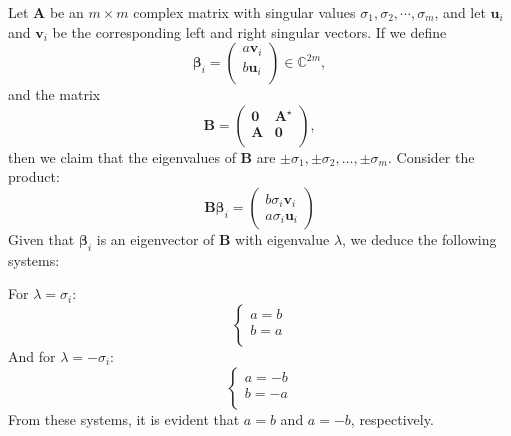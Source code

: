 \documentclass{article}
\begin{document}
Let $\bm{A}$ be an $m \times m$ complex matrix with singular values $\sigma_1, \sigma_2, \cdots, \sigma_m$, and let $\bm{u}_i$ and $\bm{v}_i$ be the corresponding left and right singular vectors. If we define 
\[ \bm{\beta}_i = \begin{pmatrix}
a \bm{v}_i \\
b \bm{u}_i \\
\end{pmatrix} \in \mathbb{C}^{2m}, \]
and the matrix
\[ \bm{B} = \begin{pmatrix}
\bm{0} & \bm{A}^\star \\
\bm{A} & \bm{0} \\
\end{pmatrix}, \]
then we claim that the eigenvalues of $ \bm{B} $ are $ \pm \sigma_1, \pm \sigma_2, \dots, \pm \sigma_m $.
Consider the product:
$$
\bm{B} \bm{\beta}_i =  \begin{pmatrix}
b \sigma_i \bm{v}_i\\
a \sigma_i \bm{u}_i
\end{pmatrix}
$$
Given that \( \bm{\beta}_i \) is an eigenvector of \( \bm{B} \) with eigenvalue \( \lambda \), we deduce the following systems:

For \( \lambda = \sigma_i \):
\[ \left\{ \begin{array}{l}
a = b \\
b = a \\
\end{array} \right. \]
And for \( \lambda = -\sigma_i \):
\[ \left\{ \begin{array}{l}
a = -b \\
b = -a \\
\end{array} \right. \]
From these systems, it is evident that \( a = b \) and \( a = -b \), respectively. 
\end{document}
